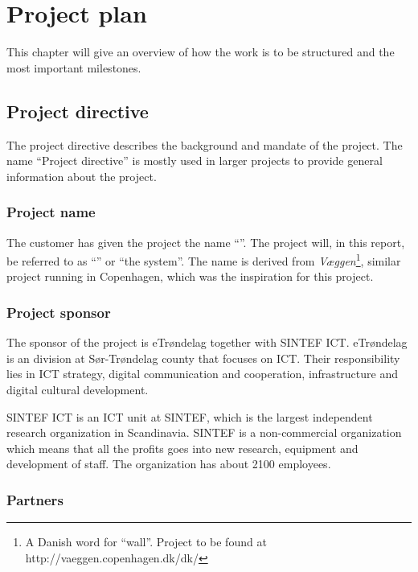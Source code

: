 \documentclass[11pt]{book}
\begin{document}
\chapter{Project plan}
\label{chap:project_plan}
This chapter will give an overview of how the work is to be structured and the most important milestones.

\section{Project directive}
The project directive describes the background and mandate of the project. The name ``Project directive'' is mostly used in larger projects to provide general information about the project.

\subsection{Project name}
The customer has given the project the name ``\fullprojectname''. The project will, in this report, be referred to as ``\shortprojectname'' or ``the system''. The name is derived from \emph{Væggen}\footnote{A Danish word for ``wall''. Project to be found at http://vaeggen.copenhagen.dk/dk/}, similar project running in Copenhagen, which was the inspiration for this project.

\subsection{Project sponsor}
The sponsor of the project is eTrøndelag together with SINTEF ICT.
eTrøndelag is an division at Sør-Trøndelag county that focuses on ICT. Their responsibility lies in ICT strategy, digital communication and cooperation, infrastructure and digital cultural development.

SINTEF ICT is an ICT unit at SINTEF, which is the largest independent research organization in Scandinavia. SINTEF is a non-commercial organization which means that all the profits goes into new research, equipment and development of staff. The organization has about 2100 employees.

\subsection{Partners}
\end{document}
